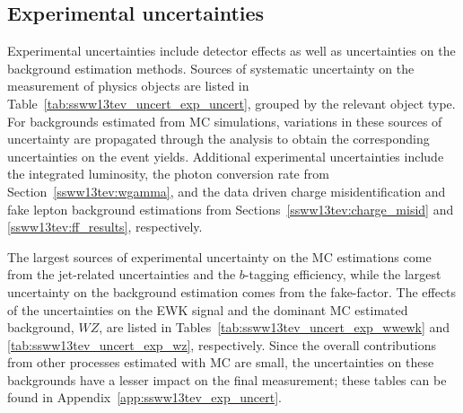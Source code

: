 \subsection{Experimental uncertainties}\label{ssww13tev:experimental_uncert}
Experimental uncertainties include detector effects as well as uncertainties on the background estimation methods.
Sources of systematic uncertainty on the measurement of physics objects are listed in Table~\ref{tab:ssww13tev_uncert_exp_uncert}, grouped by the relevant object type.
For backgrounds estimated from MC simulations, variations in these sources of uncertainty are propagated through the analysis to obtain the corresponding uncertainties on the event yields.
Additional experimental uncertainties include the integrated luminosity, the photon conversion rate from Section~\ref{ssww13tev:wgamma}, and the data driven charge misidentification and fake lepton background estimations from Sections~\ref{ssww13tev:charge_misid} and \ref{ssww13tev:ff_results}, respectively.

The largest sources of experimental uncertainty on the MC estimations come from the jet-related uncertainties and the $b$-tagging efficiency, while the largest uncertainty on the background estimation comes from the fake-factor.
The effects of the uncertainties on the \ssww EWK signal and the dominant MC estimated background, $WZ$, are listed in Tables~\ref{tab:ssww13tev_uncert_exp_wwewk} and \ref{tab:ssww13tev_uncert_exp_wz}, respectively.
Since the overall contributions from other processes estimated with MC are small, the uncertainties on these backgrounds have a lesser impact on the final measurement; these tables can be found in Appendix~\ref{app:ssww13tev_exp_uncert}.

